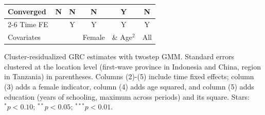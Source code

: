 \begin{table}[htbp]
\begin{threeparttable}
\begin{tabular}{l ccccc}
Converged           &           N   &           N   &           N   &           Y   &           N   \\
\cmidrule{2-6} Time FE & & Y & Y & Y & Y \\ Covariates & & & Female & \& Age$^2$ & All \\ \bottomrule \end{tabular} \begin{tablenotes}[flushleft] \footnotesize \item{Cluster-residualized GRC estimates with twostep GMM. Standard errors clustered at the location level (first-wave province in Indonesia and China, region in Tanzania) in parentheses. Columns (2)-(5) include time fixed effects; column (3) adds a female indicator, column (4) adds age squared, and column (5) adds education (years of schooling, maximum across periods) and its square. Stars: $^{*} p<0.10$; $^{**} p<0.05$; $^{***} p<0.01$.} \end{tablenotes} \end{threeparttable} \end{table}
